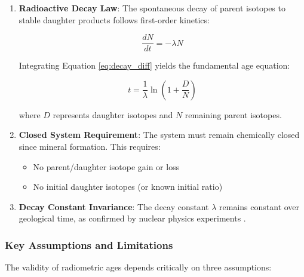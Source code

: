 \documentclass{article}
\begin{document}
\begin{enumerate}
    \item \textbf{Radioactive Decay Law}: The spontaneous decay of parent isotopes to stable daughter products follows first-order kinetics:
    
    \begin{equation}
        \frac{dN}{dt} = -\lambda N
        \label{eq:decay_diff}
    \end{equation}
    
    Integrating Equation \eqref{eq:decay_diff} yields the fundamental age equation:
    
    \begin{equation}
        t = \frac{1}{\lambda} \ln\left(1 + \frac{D}{N}\right)
        \label{eq:age}
    \end{equation}
    
    where \( D \) represents daughter isotopes and \( N \) remaining parent isotopes.

    \item \textbf{Closed System Requirement}: The system must remain chemically closed since mineral formation. This requires:
    \begin{itemize}
        \item No parent/daughter isotope gain or loss
        \item No initial daughter isotopes (or known initial ratio)
    \end{itemize}
    
    \item \textbf{Decay Constant Invariance}: The decay constant \( \lambda \) remains constant over geological time, as confirmed by nuclear physics experiments \cite{Begemann2001}.
\end{enumerate}

\subsubsection*{Key Assumptions and Limitations}
The validity of radiometric ages depends critically on three assumptions:
\end{document}
